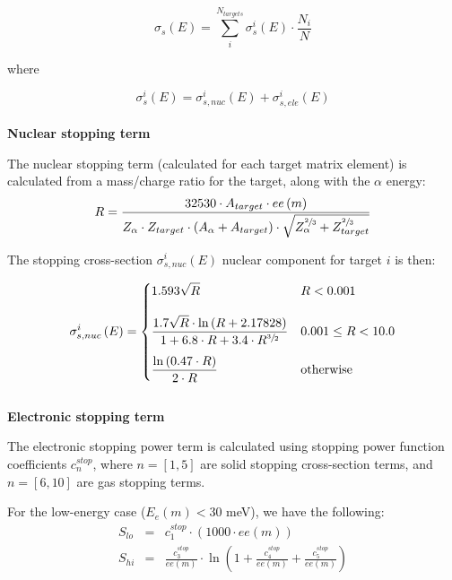 \documentclass[10pt]{article}
\begin{document}
\begin{equation}
\sigma_s\left(E\right) = \sum_{i}^{N_{targets}} \sigma_s^i\left(E\right) \cdot \frac{N_i}{N}
\end{equation}

where

\begin{equation}
\sigma_s^i\left(E\right) = \sigma_{s,nuc}^i\left(E\right) + \sigma_{s,ele}^i\left(E\right)
\end{equation}
\\

\textbf{Nuclear stopping term}

The nuclear stopping term (calculated for each target matrix element) is calculated from a mass/charge ratio for the target, along with the $\alpha$ energy:
\begin{equation}
\displaystyle R = \frac{32530 \cdot A_{target} \cdot ee\left(m\right)}{Z_\alpha \cdot Z_{target} \cdot \left(A_\alpha + A_{target} \right) \cdot \sqrt{ Z_\alpha^{\sfrac{2}{3}} + Z_{target}^{\sfrac{2}{3}} } } 
\end{equation}

The stopping cross-section $\sigma_{s,nuc}^i \left(E\right)$ nuclear component for target $i$ is then:

\begin{equation}
\displaystyle \sigma_{s,nuc}^i\left(E\right) = 
\begin{cases}
\displaystyle 1.593 \sqrt{R} & R < 0.001 \\[12pt]
\displaystyle \frac{1.7 \sqrt{R} \cdot \ln \left(R + 2.17828\right)}{1 + 6.8 \cdot R + 3.4 \cdot R^{\sfrac{3}{2}}} & 0.001 \leq R < 10.0 \\[12pt]
\displaystyle \frac{\ln\left(0.47\cdot R\right)}{2\cdot R} & \mathrm{otherwise}
\end{cases}
\end{equation}
\\

\textbf{Electronic stopping term}

The electronic stopping power term is calculated using stopping power function coefficients $c_n^{stop}$, where $n=[1,5]$ are solid stopping cross-section terms, and $n=[6,10]$ are gas stopping terms.

For the low-energy case ($E_e\left(m\right) < 30$ meV), we have the following:
\begin{eqnarray}
S_{lo} & = & c_1^{stop} \cdot \left(1000 \cdot ee\left(m\right) \right) \\
S_{hi} & = & \frac{c_3^{stop}}{ee\left(m\right)} \cdot \ln \left( 1 + \frac{c_4^{stop}}{ee\left(m\right)} + \frac{c_5^{stop}}{ee\left(m\right)} \right) 
\end{eqnarray}
\end{document}

